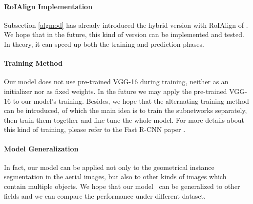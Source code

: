 \paragraph{RoIAlign Implementation}
Subsection \ref{algmod} has already introduced the hybrid version with RoIAlign of \modelnameshort. We hope that in the future, this kind of version can be implemented and tested. In theory, it can speed up both the training and prediction phases.

\paragraph{Training Method}
Our model does not use pre-trained VGG-16 during training, neither as an initializer nor as fixed weights. In the future we may apply the pre-trained VGG-16 to our model's training. Besides, we hope that the alternating training method can be introduced, of which the main idea is to train the subnetworks separately, then train them together and fine-tune the whole model. For more details about this kind of training, please refer to the Fast R-CNN paper \cite{fasterrcnn}.

\paragraph{Model Generalization}
In fact, our model can be applied not only to the geometrical instance segmentation in the aerial images, but also to other kinds of images which contain multiple objects. We hope that our model \modelnameshort\ can be generalized to other fields and we can compare the performance under different dataset.

